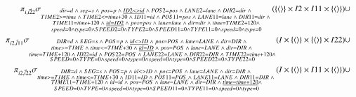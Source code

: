 \begin{eqnarray*}
&& \pi_{\vec{i, i22}}\sigma_{\substack{dir = d \;\wedge\; seg = s \;\wedge\; pos = p \;\wedge\; \underline{ ID2 <> id } \;\wedge\; POS2 = pos \;\wedge\; LANE2 = lane \;\wedge\; DIR2 = dir \;\wedge\; \\ TIME2 >= time \;\wedge\; TIME2 <= time + 30 \;\wedge\; ID11 = id \;\wedge\; POS11 = pos \;\wedge\;  LANE11 = lane \;\wedge\; DIR11= dir \;\wedge\; \\TIME11 = time + 120 \;\wedge\; \underline{id = ID2} \;\wedge\; pos = pos \;\wedge\;  lane = lane \;\wedge\; dir = dir \;\wedge\; time = TIME2 + 120 \wedge \\speed = 0 \wedge type = 0 \wedge SPEED2 = 0 \wedge TYPE2 = 0 \wedge  SPEED11 = 0 \wedge TYPE11 = 0 \wedge speed = 0 \wedge type =0 }}(\{\tuple{} \} \times I2 \times I11 \times \{\tuple{} \}) \cup \\
&& \pi_{\vec{i2, i11}}\sigma_{ \substack{DIR = d \;\wedge\; SEG = s \;\wedge\; POS = p \;\wedge\; \underline{ id <> ID } \;\wedge\; pos = POS \;\wedge\; lane = LANE \;\wedge\; dir = DIR \;\wedge\; \\ time >= TIME \;\wedge\; time <= TIME + 30 \;\wedge\; \underline{id = ID} \;\wedge\; pos = POS \;\wedge\;  lane = LANE \;\wedge\; dir=DIR \;\wedge\; \\time = TIME + 120 \;\wedge\; ID22 = id \;\wedge\; POS22 = POS \;\wedge\;  LANE22 = LANE \;\wedge\; DIR22 = DIR \;\wedge\; TIME22 = time + 120 \wedge \\SPEED = 0 \wedge TYPE = 0 \wedge speed = 0 \wedge type = 0 \wedge  speed = 0 \wedge type = 0 \wedge SPEED22 = 0 \wedge TYPE22 =0 }}(I \times  \{\tuple{} \} \times  \{\tuple{} \} \times I22) \cup \\
&& \pi_{\vec{i2, i22}}\sigma_{\substack{DIR = d \;\wedge\; SEG = s \;\wedge\; POS = p \;\wedge\;  id <> ID \;\wedge\; pos = POS \;\wedge\; lane = LANE \;\wedge\; dir = DIR \;\wedge\; \\ time >= TIME \;\wedge\; time <= TIME + 30 \;\wedge\; ID11 = ID \;\wedge\; POS11 = POS \;\wedge\;  LANE11 = LANE \;\wedge\; DIR11=DIR \;\wedge\; \\TIME11 = TIME + 120 \;\wedge\; id = id \;\wedge\; pos = POS \;\wedge\;  lane = LANE \;\wedge\; dir = DIR \;\wedge\; \underline {time = time + 120} \wedge \\SPEED = 0 \wedge TYPE = 0 \wedge speed = 0 \wedge type = 0 \wedge  SPEED11 = 0 \wedge TYPE11 = 0 \wedge speed = 0 \wedge type =0 }}(I \times \{\tuple{} \}  \times I11 \times \{\tuple{} \}) \cup \\

\end{eqnarray*}
